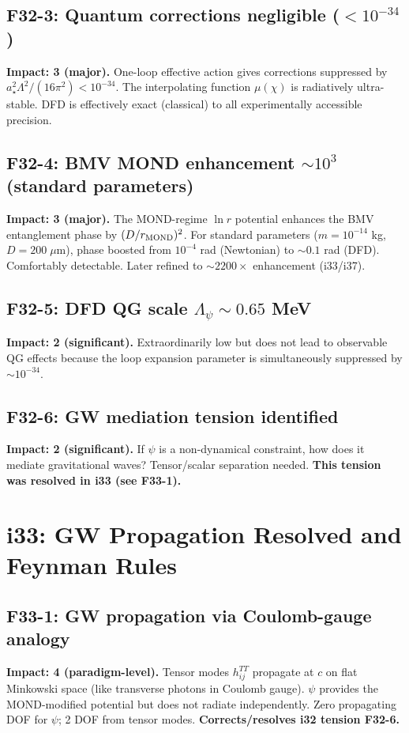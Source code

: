 \documentclass[11pt,a4paper]{article}
\begin{document}
\subsection{F32-3: Quantum corrections negligible ($<10^{-34}$)}
\textbf{Impact: 3 (major).} One-loop effective action gives corrections suppressed by $a_\star^2\Lambda^2/(16\pi^2) < 10^{-34}$. The interpolating function $\mu(\chi)$ is radiatively ultra-stable. DFD is effectively exact (classical) to all experimentally accessible precision.

\subsection{F32-4: BMV MOND enhancement $\sim 10^3$ (standard parameters)}
\textbf{Impact: 3 (major).} The MOND-regime $\ln r$ potential enhances the BMV entanglement phase by $(D/r_{\rm MOND})^2$. For standard parameters ($m = 10^{-14}$ kg, $D = 200\;\mu$m), phase boosted from $10^{-4}$ rad (Newtonian) to $\sim 0.1$ rad (DFD). Comfortably detectable. Later refined to $\sim 2200\times$ enhancement (i33/i37).

\subsection{F32-5: DFD QG scale $\Lambda_\psi \sim 0.65$ MeV}
\textbf{Impact: 2 (significant).} Extraordinarily low but does not lead to observable QG effects because the loop expansion parameter is simultaneously suppressed by $\sim 10^{-34}$.

\subsection{F32-6: GW mediation tension identified}
\textbf{Impact: 2 (significant).} If $\psi$ is a non-dynamical constraint, how does it mediate gravitational waves? Tensor/scalar separation needed. \textbf{This tension was resolved in i33 (see F33-1).}

\section{i33: GW Propagation Resolved and Feynman Rules}
\label{sec:i33}

\subsection{F33-1: GW propagation via Coulomb-gauge analogy}
\textbf{Impact: 4 (paradigm-level).} Tensor modes $h_{ij}^{TT}$ propagate at $c$ on flat Minkowski space (like transverse photons in Coulomb gauge). $\psi$ provides the MOND-modified potential but does not radiate independently. Zero propagating DOF for $\psi$; 2 DOF from tensor modes. \textbf{Corrects/resolves i32 tension F32-6.}
\end{document}
